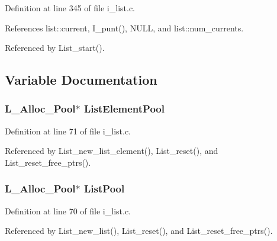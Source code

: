 Definition at line 345 of file i\_\-list.c.

References list::current, I\_\-punt(), NULL, and list::num\_\-currents.

Referenced by List\_\-start().

\subsection{Variable Documentation}
\subsubsection{\setlength{\rightskip}{0pt plus 5cm}\bf{L\_\-Alloc\_\-Pool}$\ast$ \bf{List\-Element\-Pool}}\label{i__list_8h_311b4ac6de98b268c1838d6d585537dd}




Definition at line 71 of file i\_\-list.c.

Referenced by List\_\-new\_\-list\_\-element(), List\_\-reset(), and List\_\-reset\_\-free\_\-ptrs().
\subsubsection{\setlength{\rightskip}{0pt plus 5cm}\bf{L\_\-Alloc\_\-Pool}$\ast$ \bf{List\-Pool}}\label{i__list_8h_b3447a3b749835f2478a1c414a53c0d1}




Definition at line 70 of file i\_\-list.c.

Referenced by List\_\-new\_\-list(), List\_\-reset(), and List\_\-reset\_\-free\_\-ptrs().